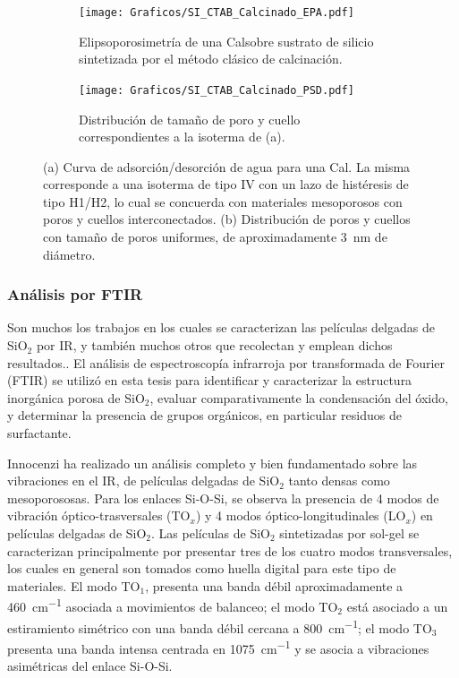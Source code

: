 		 		\begin{figure}[!h]
		     	  		\begin{subfigure}[t]{0.495\textwidth}
		     	  		\texttt{[image: Graficos/SI\_CTAB\_Calcinado\_EPA.pdf]}
						\caption{Elipsoporosimetría de una Cal\pdmF\space sobre sustrato de silicio sintetizada por el método clásico de calcinación.}
						\label{fig:CTAB_EPA}
						\end{subfigure}
						\begin{subfigure}[t]{0.495\textwidth}
		     	  		\texttt{[image: Graficos/SI\_CTAB\_Calcinado\_PSD.pdf]}
						\caption{Distribución de tamaño de poro y cuello correspondientes a la isoterma de (a).}
						\label{fig:CTAB_PSD}
						\end{subfigure}
						\caption[Elipsoporosimetría para sistemas Cal\pdmC.]{(a) Curva de adsorción/desorción de agua para una Cal\pdmC. La misma corresponde a una isoterma de tipo IV con un lazo de histéresis de tipo H1/H2, lo cual se concuerda con materiales mesoporosos con poros y cuellos interconectados. (b) Distribución de poros y cuellos con tamaño de poros uniformes, de aproximadamente \SI{3}{\nm} de diámetro.}
						\end{figure}

	    \subsubsection{Análisis por FTIR}\label{sec:Analisis_IR}

		 Son muchos los trabajos en los cuales se caracterizan las películas delgadas de SiO$_2$ por IR\cite{Olsen1989,Almeida1990,Redol1997,Innocenzi2003}, y también muchos otros que recolectan y emplean dichos resultados.\cite{Angelome2008,Calvo2008,Calvo20210}.
		 El análisis de espectroscopía infrarroja por transformada de Fourier (FTIR) se utilizó en esta tesis para identificar y caracterizar la estructura inorgánica porosa de SiO$_2$, evaluar comparativamente la condensación del óxido, y determinar la presencia de grupos orgánicos, en particular residuos de surfactante. 

		 Innocenzi ha realizado un análisis completo y bien fundamentado sobre las vibraciones en el IR, de películas delgadas de SiO$_2$ tanto densas como mesoporososas.\cite{Innocenzi2003} Para los enlaces Si-O-Si, se observa la presencia de 4 modos de vibración óptico-trasversales (TO$_x$) y 4 modos óptico-longitudinales (LO$_x$) en películas delgadas de SiO$_2$. Las películas de SiO$_2$ sintetizadas por sol-gel se caracterizan principalmente por presentar tres de los cuatro modos transversales, los cuales en general son tomados como huella digital para este tipo de materiales.\cite{Innocenzi2003,Angelome2008,Calvo2008} El modo TO$_1$, presenta una banda débil aproximadamente a \SI{460}{\cm^{-1}} asociada a movimientos de balanceo; el modo TO$_2$ está asociado a un estiramiento simétrico con una banda débil cercana a \SI{800}{\cm^{-1}}; el modo TO$_3$ presenta una banda intensa centrada en \SI{1075}{\cm^{-1}} y se asocia a vibraciones asimétricas del enlace Si-O-Si. 

